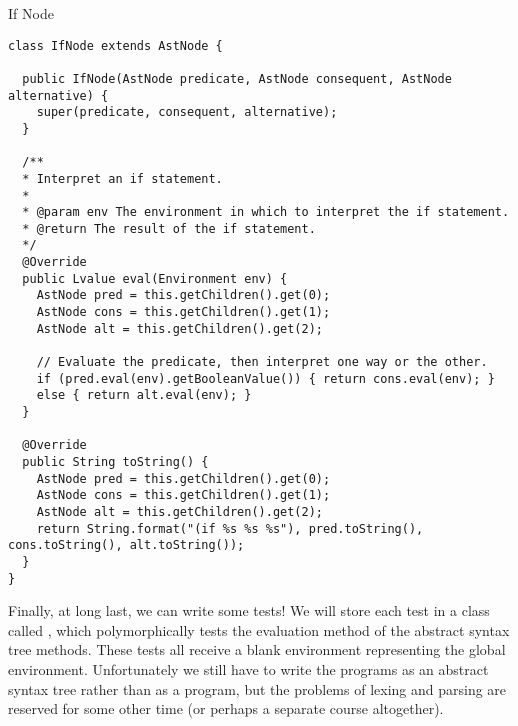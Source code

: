 \begin{cl}{If Node}
\begin{lstlisting}[language=MyJava]
class IfNode extends AstNode {
  
  public IfNode(AstNode predicate, AstNode consequent, AstNode alternative) {
    super(predicate, consequent, alternative);
  }

  /**
  * Interpret an if statement.
  *
  * @param env The environment in which to interpret the if statement.
  * @return The result of the if statement.
  */
  @Override
  public Lvalue eval(Environment env) {
    AstNode pred = this.getChildren().get(0);
    AstNode cons = this.getChildren().get(1);
    AstNode alt = this.getChildren().get(2);

    // Evaluate the predicate, then interpret one way or the other.
    if (pred.eval(env).getBooleanValue()) { return cons.eval(env); } 
    else { return alt.eval(env); }
  }
  
  @Override
  public String toString() {
    AstNode pred = this.getChildren().get(0);
    AstNode cons = this.getChildren().get(1);
    AstNode alt = this.getChildren().get(2);
    return String.format("(if %s %s %s"), pred.toString(), cons.toString(), alt.toString());
  }
}
\end{lstlisting}
\end{cl}

Finally, at long last, we can write some tests! We will store each test in a class called , which polymorphically tests the evaluation method of the abstract syntax tree methods. These tests all receive a blank environment representing the global environment. Unfortunately we still have to write the programs as an abstract syntax tree rather than as a program, but the problems of lexing and parsing are reserved for some other time (or perhaps a separate course altogether).

